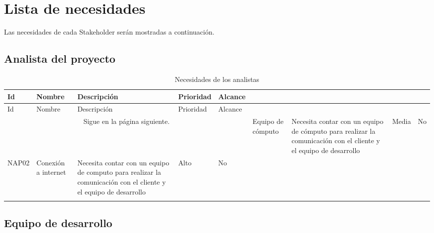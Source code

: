 \chapter{Lista de necesidades}
Las necesidades de cada Stakeholder serán mostradas a continuación. 

\section {Analista del proyecto}
    
\begin{longtable}{|m{1.5cm}|m{3cm}|m{5cm}|m{2cm}| m{2cm}|}
        \rowcolor[HTML]{3531FF} 
        {\color[HTML]{FFFFFF} Id} &{\color[HTML]{FFFFFF}Nombre} & {\color[HTML]{FFFFFF} Descripción} & {\color[HTML]{FFFFFF}Prioridad} & {\color[HTML]{FFFFFF}Alcance}\\
        \hline
        \endfirsthead
        \hline
        \rowcolor[HTML]{3531FF} 
        {\color[HTML]{FFFFFF} Id} &{\color[HTML]{FFFFFF}Nombre} & {\color[HTML]{FFFFFF} Descripción} & {\color[HTML]{FFFFFF}Prioridad} & {\color[HTML]{FFFFFF}Alcance}\\
        \hline 
        \endhead
        \multicolumn{5}{c}{Sigue en la página siguiente.}
        \endfoot
        \endlastfoot
        NAP01 & Equipo de cómputo & Necesita contar con un equipo de cómputo para realizar la comunicación con el cliente y el equipo de desarrollo & Media & No \\ \hline
        NAP02 & Conexión a internet & Necesita contar con un equipo de computo para realizar la comunicación con el cliente y el equipo de desarrollo & Alto & No \\ \hline
    \caption{Necesidades de los analistas}
    \label{tab:NAPs}
\end{longtable}

\section {Equipo de desarrollo}


